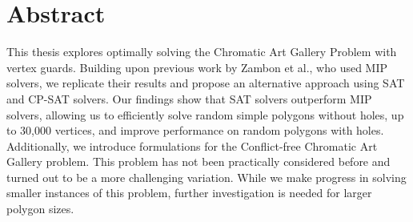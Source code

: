 \chapter*{Abstract}
This thesis explores optimally solving the Chromatic Art Gallery Problem with vertex guards. Building upon previous work by Zambon et al., who used MIP solvers, we replicate their results and propose an alternative approach using SAT and CP-SAT solvers. Our findings show that SAT solvers outperform MIP solvers, allowing us to efficiently solve random simple polygons without holes, up to 30,000 vertices, and improve performance on random polygons with holes. Additionally, we introduce formulations for the Conflict-free Chromatic Art Gallery problem. This problem has not been practically considered before and turned out to be a more challenging variation. While we make progress in solving smaller instances of this problem, further investigation is needed for larger polygon sizes.
	
